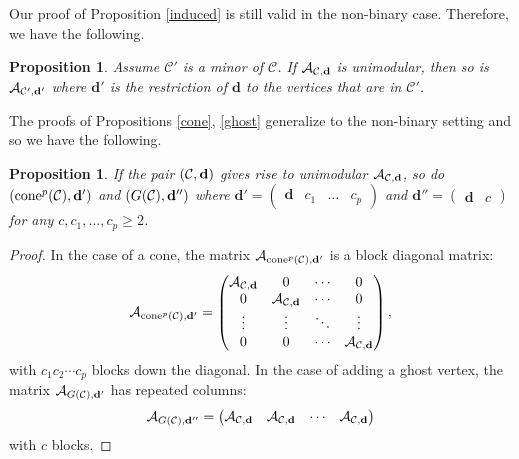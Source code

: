 \documentclass[letterpaper,12pt]{amsart}
\theoremstyle{plain}
\newtheorem{prop}[thm]{Proposition}
\theoremstyle{definition}
\theoremstyle{remark}
\newcommand{\bfd}{\mathbf{d}}
\newcommand{\calc}{\mathcal{C}}
\newcommand{\cone}{\textnormal{cone}}
\begin{document}
Our proof of Proposition \ref{induced} is still valid in the non-binary case.
Therefore, we have the following.

\begin{prop}\label{minornonbinary}
	Assume $\mathcal{C}'$ is a minor of $\mathcal{C}$.
	If $\mathcal{A}_{\mathcal{C},{\bf d}}$ is unimodular, then so is $\mathcal{A}_{\mathcal{C}',{\bf d}'}$
	where $\bfd'$ is the restriction of $\bfd$ to the vertices that are in $\calc'$.
\end{prop}

The proofs of Propositions \ref{cone}, \ref{ghost} generalize to the non-binary setting and so we have the following.

\begin{prop}\label{coneghost}
	If the pair $(\mathcal{C},{\bf d})$ gives rise to unimodular $\mathcal{A}_{\mathcal{C},{\bf d}}$,
	so do $(\cone^p(\mathcal{C}),{\bf d}')$ and $(G(\mathcal{C}),{\bf d}'')$
	where $\bfd' = \begin{pmatrix} \bfd & c_1 & \dots & c_p \end{pmatrix}$ and
	$\bfd'' = \begin{pmatrix} \bfd & c \end{pmatrix}$ for any $c,c_1,\dots,c_p \ge 2$.
\end{prop}

\begin{proof}
In the case of a cone, the matrix $\mathcal{A}_{\cone^p(\mathcal{C}),{\bf d}'}$
is a block diagonal matrix:
$$
\mathcal{A}_{\cone^p(\mathcal{C}),{\bf d}'} = 
\begin{pmatrix}
\mathcal{A}_{\mathcal{C}, {\bf d}} & 0 & \cdots & 0  \\
0 &  \mathcal{A}_{\mathcal{C}, {\bf d}} & \cdots & 0  \\
\vdots & \vdots & \ddots & \vdots  \\
0 & 0 & \cdots & \mathcal{A}_{\mathcal{C}, {\bf d}}
\end{pmatrix},
$$
with $c_{1}c_{2} \cdots c_{p}$ blocks down the diagonal.
In the case of adding a ghost vertex, the matrix $\mathcal{A}_{G(\mathcal{C}),{\bf d}'}$ has repeated columns:
$$
\mathcal{A}_{G(\mathcal{C}),{\bf d}''} = 
\begin{pmatrix}
\mathcal{A}_{\mathcal{C}, {\bf d}} & \mathcal{A}_{\mathcal{C}, {\bf d}} & \cdots & \mathcal{A}_{\mathcal{C}, {\bf d}}  \\
\end{pmatrix}
$$
with $c$ blocks.
\end{proof}
\end{document}
